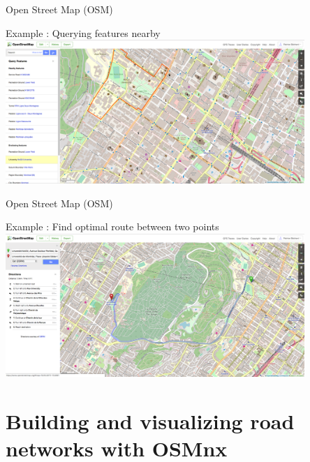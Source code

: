 \documentclass[aspectratio=169]{beamer}
\begin{document}
\begin{frame}{Open Street Map (OSM) \cite{haklay2008openstreetmap}}

{\Large Example : Querying features nearby}
\centering
\includegraphics[width=0.85\textwidth]{figures/osm_query}

\end{frame}

\begin{frame}{Open Street Map (OSM) \cite{haklay2008openstreetmap}}

{\Large Example : Find optimal route between two points}
\centering
\includegraphics[width=0.85\textwidth]{figures/osm_routing}

\end{frame}


\section{Building and visualizing road networks with OSMnx}
\end{document}

